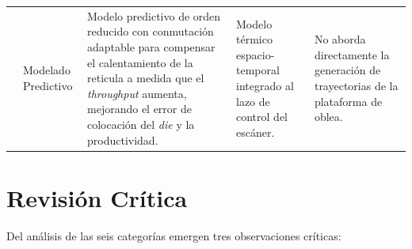 \documentclass[11pt]{article}
\theoremstyle{definition}
\begin{document}
\begin{longtable}{L{2cm} L{2.6cm} L{4.4cm} L{2.8cm} L{3.9cm}}
\supercite{Subramanian2024} &
Modelado Predictivo &
Modelo predictivo de orden reducido con conmutación adaptable para compensar el calentamiento de la reticula a medida que el \textit{throughput} aumenta, mejorando el error de colocación del \textit{die} y la productividad. &
Modelo térmico espacio-temporal integrado al lazo de control del escáner. &
No aborda directamente la generación de trayectorias de la plataforma de oblea. \\[8pt]

\end{longtable}
\endgroup

\section{Revisión Crítica}

Del análisis de las seis categorías emergen tres observaciones críticas:
\end{document}
